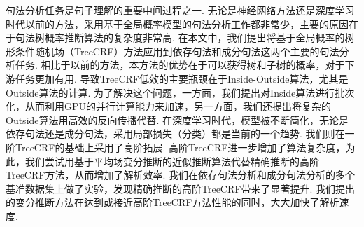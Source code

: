 
\begin{cabstract}
	句法分析任务是句子理解的重要中间过程之一.
	无论是神经网络方法还是深度学习时代以前的方法，采用基于全局概率模型的句法分析工作都非常少，主要的原因在于句法树概率推断算法的复杂度非常高.
	在本文中，我们提出将基于全局概率的树形条件随机场（TreeCRF）方法应用到依存句法和成分句法这两个主要的句法分析任务.
	相比于以前的方法，本方法的优势在于可以获得树和子树的概率，对于下游任务更加有用.
	导致TreeCRF低效的主要瓶颈在于Inside-Outside算法，尤其是Outside算法的计算.
	为了解决这个问题，一方面，我们提出对Inside算法进行批次化，从而利用GPU的并行计算能力来加速，另一方面，我们还提出将复杂的Outside算法用高效的反向传播代替.
	在深度学习时代，模型被不断简化，无论是依存句法还是成分句法，采用局部损失（分类）都是当前的一个趋势.
	我们则在一阶TreeCRF的基础上采用了高阶拓展.
	高阶TreeCRF进一步增加了算法复杂度，为此，我们尝试用基于平均场变分推断的近似推断算法代替精确推断的高阶TreeCRF方法，从而增加了解析效率.
	我们在依存句法分析和成分句法分析的多个基准数据集上做了实验，发现精确推断的高阶TreeCRF带来了显著提升.
	我们提出的变分推断方法在达到或接近高阶TreeCRF方法性能的同时，大大加快了解析速度.
	

\end{cabstract}
